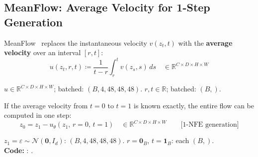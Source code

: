 \subsection{MeanFlow: Average Velocity for 1-Step Generation}

MeanFlow~\cite{meanflow} replaces the instantaneous velocity $v(z_t,t)$ with
the \textbf{average velocity} over an interval $[r,t]$:
\begin{equation}
  u(z_t,r,t)
    \coloneqq \frac{1}{t-r}\int_r^t v(z_s,s)\,ds
    \quad \in \mathbb{R}^{C \times D \times H \times W}
  \label{eq:avg_velocity}
\end{equation}
\begin{shapes}
$u \in \mathbb{R}^{C \times D \times H \times W}$;
\quad batched: $(B, 4, 48, 48, 48)$.
\quad $r, t \in \mathbb{R}$; batched: $(B,)$.
\end{shapes}

\noindent
If the average velocity from $t{=}0$ to $t{=}1$ is known exactly, the entire
flow can be computed in one step:
\begin{equation}
  z_0 = z_1 - u_\theta(z_1,\,r{=}0,\,t{=}1)
  \quad \in \mathbb{R}^{C \times D \times H \times W}
  \qquad \text{[1-NFE generation]}
  \label{eq:one_nfe}
\end{equation}
\begin{shapes}
$z_1 = \varepsilon \sim \mathcal{N}(\mathbf{0}, I_d)$: $(B, 4, 48, 48, 48)$.
\quad $r = \mathbf{0}_B$, $t = \mathbf{1}_B$: each $(B,)$.\\
\textbf{Code:} : .
\end{shapes}
